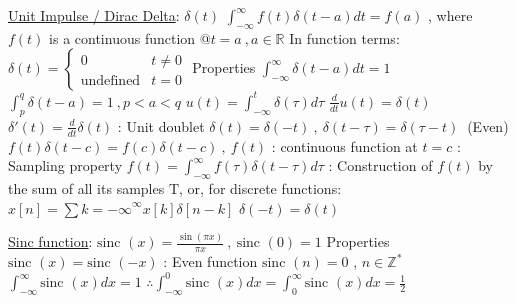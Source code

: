 \documentclass[12pt]{article}
\def\sinc{\text{sinc\ }} %
\newcommand{\Tau}{\mathrm{T}} %
\begin{document}
\begin{flushleft}
	\uline{Unit Impulse / Dirac Delta}: $\delta(t)$ \linebreak 
	$\displaystyle \int_{-\infty}^{\infty} f(t) \delta (t-a) dt = f(a) $ , where $f(t)$ is a continuous function @$t=a \ , a\in \mathbb{R} $ \linebreak 
	\textbullet \quad In function terms: $\delta (t) = \begin{cases} 0 & t \neq 0 \\ \text{undefined} & t=0 \end{cases} $ \linebreak 
	Properties \linebreak 
	\textbullet \quad $\displaystyle \int_{-\infty}^{\infty} \delta (t-a) dt = 1 $ \linebreak 
	\textbullet \quad $\displaystyle \int_p^q \delta (t-a) = 1 \ , p < a < q $ \linebreak 
	\textbullet \quad $u(t) = \int_{-\infty}^t \delta(\tau) d\tau $ \linebreak 
	\textbullet \quad $\frac{d}{dt} u(t) = \delta (t) $ \linebreak 
	\textbullet \quad $ \delta'(t) = \frac{d}{dt} \delta (t) $  :  Unit doublet \linebreak 
	\textbullet \quad $\delta (t) = \delta (-t) \ , \ \delta(t-\tau) = \delta (\tau - t) \ $ (Even) \linebreak 
	\textbullet \quad $f(t) \delta (t-c) = f(c) \delta (t-c) \ , \ f(t)$  :  continuous function at $t=c$  :  Sampling property \linebreak 
	\textbullet \quad $\displaystyle f(t) = \int_{-\infty}^{\infty} f(\tau) \delta (t-\tau) d\tau $  :  Construction of $f(t)$ by the sum of all its samples $\Tau$, or, for discrete functions: $x[n] = \sum \limits{k=-\infty}^{\infty} x[k] \delta[n-k]$ \linebreak 
	\textbullet \quad $\delta (-t) = \delta (t)$ \linebreak 
	
	\uline{Sinc function}: $ \sinc(x) = \frac{\sin (\pi x)}{\pi x} \ , \ \sinc (0) = 1$ \linebreak 
	Properties \linebreak 
	\textbullet \quad $\sinc (x) = \sinc (-x) $  :  Even function \linebreak 
	\textbullet \quad $\sinc (n) = 0 $ , $ n \in \mathbb{Z}^* $ \linebreak 
	\textbullet \quad $\displaystyle \int_{-\infty}^{\infty} \sinc (x) dx = 1$ \linebreak 
	$\therefore \int_{-\infty}^0 \sinc (x) dx = \int_0^{\infty} \sinc (x) dx = \frac{1}{2} $ \linebreak 
	

\end{flushleft}
\end{document}
